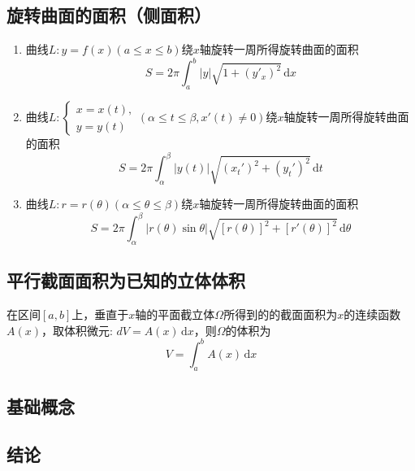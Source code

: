 \documentclass[a4paper,12pt]{article}
\begin{document}
    \subsection{旋转曲面的面积（侧面积）}

    {\color{customgreen}{在弧长公式基础上多乘了$2\pi|y(x)|$}}

    \begin{enumerate}
        \item 曲线$L: y = f(x)(a \leq x \leq b)$绕$x$轴旋转一周所得旋转曲面的面积
        \[
            S = 2\pi\int_a^b |y|\sqrt {1 + (y'_x)^2}\,\mathrm{d}x
        \]
        \item 曲线$L: \begin{cases}
                          x = x(t), \\
                          y = y(t)
        \end{cases}(\alpha \leq t \leq \beta, x'(t) \neq 0)$绕$x$轴旋转一周所得旋转曲面的面积
        \[
            S = 2\pi\int_{\alpha}^{\beta} |y(t)|\sqrt {(x_t')^2 + (y_t')^2}\,\mathrm{d}t
        \]
        \item 曲线$L: r = r(\theta)(\alpha \leq \theta \leq \beta)$绕$x$轴旋转一周所得旋转曲面的面积
        \[
            S = 2\pi\int_{\alpha}^{\beta} |r(\theta)\sin \theta|\sqrt {[r(\theta)]^2 + [r'(\theta)]^2}\,\mathrm{d}\theta
        \]
    \end{enumerate}

    \subsection{平行截面面积为已知的立体体积}

    在区间$[a, b]$上，垂直于$x$轴的平面截立体$\Omega$所得到的的截面面积为$x$的连续函数$A(x)$，取体积微元: $dV = A(x)\,\mathrm{d}x$，则$\Omega$的体积为
    \[
        V = \int_a^b A(x)\,\mathrm{d}x
    \]

    \subsection{基础概念}

    \begin{enumerate}
    \end{enumerate}

    \subsection{结论}
\end{document}
